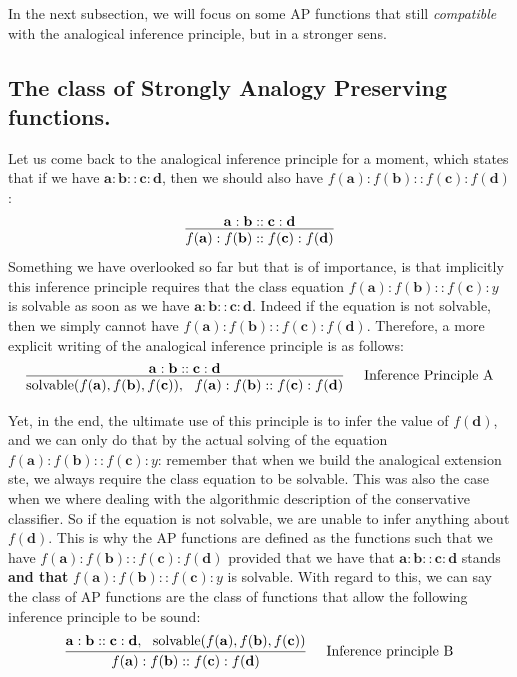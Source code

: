 In the next subsection, we will focus on some AP functions that
still \textit{compatible} with the analogical inference principle, but in a
stronger sens.

\subsection{The class of Strongly Analogy Preserving functions.}

Let us come back to the analogical inference principle for a moment, which
states that if we have  $\mathbf{a}: \mathbf{b}:: \mathbf{c}: \mathbf{d}$, then
we should also have $f(\mathbf{a}) :f(\mathbf{b}) :: f(\mathbf{c}) :
f(\mathbf{d})$:
$$
\infer{f(\mathbf{a}) : f(\mathbf{b}) :: f(\mathbf{c})
: f(\mathbf{d})}{\mathbf{a} : \mathbf{b} :: \mathbf{c} : \mathbf{d}}
$$
Something we have overlooked so far but that is of importance, is that
implicitly this inference principle requires that the class equation
$f(\mathbf{a}) : f(\mathbf{b}) :: f(\mathbf{c}) : y$ is solvable as soon as we
have $\mathbf{a} : \mathbf{b} :: \mathbf{c} : \mathbf{d}$. Indeed if the
equation is not solvable, then we simply cannot have $f(\mathbf{a}) :
f(\mathbf{b}) :: f(\mathbf{c}) : f(\mathbf{d})$.
Therefore, a more explicit writing of the analogical inference principle is as
follows: $$
\infer[\text{~~ Inference Principle A}]{\solvable(f(\mathbf{a}), f(\mathbf{b}),
f(\mathbf{c})), ~~f(\mathbf{a}) : f(\mathbf{b}) :: f(\mathbf{c}) :
f(\mathbf{d}) }{\mathbf{a} : \mathbf{b} :: \mathbf{c} : \mathbf{d}}
$$


Yet, in the end, the ultimate use of this principle is to infer the value of
$f(\mathbf{d})$, and we can only do that by the actual solving of the equation
$f(\mathbf{a}) : f(\mathbf{b}) :: f(\mathbf{c}) : y$: remember that when we
build the analogical extension ste, we always require the class equation to be
solvable. This was also the case when we where dealing with the algorithmic
description of the conservative classifier.  So if the equation is not
solvable, we are unable to infer anything about $f(\mathbf{d})$. This is why
the AP functions are defined as the functions such that we have $f(\mathbf{a})
:f(\mathbf{b}) :: f(\mathbf{c}) : f(\mathbf{d})$ provided that we have that
$\mathbf{a}: \mathbf{b}:: \mathbf{c}: \mathbf{d}$ stands \textbf{and that}
$f(\mathbf{a}) :f(\mathbf{b}) :: f(\mathbf{c}) : y$ is solvable. With regard to
this, we can say the class of AP functions are the class of functions that
allow the following inference principle to be sound: $$
\infer[\text{~~ Inference principle B}]{f(\mathbf{a}) : f(\mathbf{b}) :: f(\mathbf{c}) :
f(\mathbf{d})}{\mathbf{a} : \mathbf{b} :: \mathbf{c} : \mathbf{d}, ~~
\solvable(f(\mathbf{a}), f(\mathbf{b}), f(\mathbf{c}))} $$

